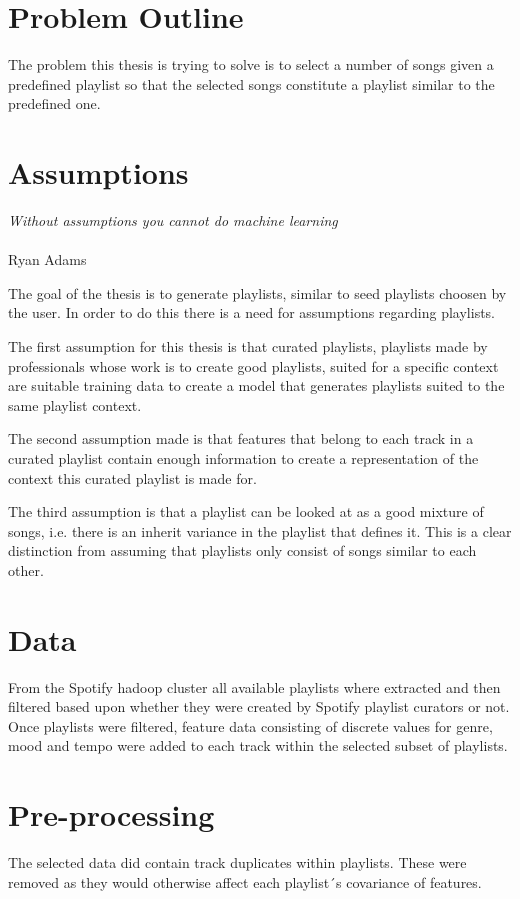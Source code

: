\documentclass[a4paper,11pt]{kth-mag}
\begin{document}
\section{Problem Outline}
The problem this thesis is trying to solve is to select a number of songs given a predefined playlist so that the selected songs constitute a playlist similar to the predefined one. 

\section{Assumptions}
\begin{displayquote}
\textit{Without assumptions you cannot do machine learning} \\\\Ryan Adams
\end{displayquote}

The goal of the thesis is to generate playlists, similar to seed playlists choosen by the user. In order to do this there is a need for assumptions regarding playlists.

The first assumption for this thesis is that curated playlists, playlists made by professionals whose work is to create good playlists, suited for a specific context are suitable training data to create a model that generates playlists suited to the same playlist context.

The second assumption made is that features that belong to each track in a curated playlist contain enough information to create a representation of the context this curated playlist is made for.

The third assumption is that a playlist can be looked at as a good mixture of songs, i.e. there is an inherit variance in the playlist that defines it. This is a clear distinction from assuming that playlists only consist of songs similar to each other.


\section{Data}
From the Spotify hadoop cluster all available playlists where extracted and then filtered based upon whether they were created by Spotify playlist curators or not. Once playlists were filtered, feature data consisting of discrete values for genre, mood and tempo were added to each track within the selected subset of playlists.

\section{Pre-processing}
The selected data did contain track duplicates within playlists. These were removed as they would otherwise affect each playlist´s covariance of features.
\end{document}
